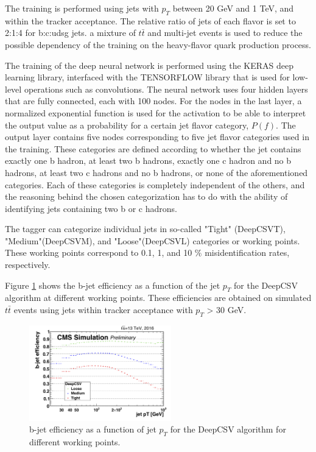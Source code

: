 The training is performed using jets with $p_{T}$ between 20 GeV and 1 TeV, and within the tracker acceptance. The relative ratio of jets of each flavor is set to 2:1:4 for b:c:udsg jets. a mixture of $t\bar{t}$ and multi-jet events is used to reduce the possible dependency of the training on the heavy-flavor quark production process.

The training of the deep neural network is performed using the KERAS\cite{chollet2015keras} deep learning library, interfaced with the TENSORFLOW\cite{tensorflow2015-whitepaper} library that is used for low-level operations such as convolutions. The neural network uses four hidden layers that are fully connected, each with 100 nodes. For the nodes in the last layer, a normalized exponential function is used for the activation to be able to interpret the output value as a probability for a certain jet flavor category, $P(f)$. The output layer contains five nodes corresponding to five jet flavor categories used in the training. These categories are defined according to whether the jet contains exactly one b hadron, at least two b hadrons, exactly one c hadron and no b hadrons, at least two c hadrons and no b hadrons, or none of the aforementioned categories. Each of these categories is completely independent of the others, and the reasoning behind the chosen categorization has to do with the ability of identifying jets containing two b or c hadrons. 

The tagger can categorize individual jets in so-called "Tight" (DeepCSVT), "Medium"(DeepCSVM), and "Loose"(DeepCSVL) categories or working points. These working points correspond to 0.1, 1, and 10 $\%$ misidentification rates, respectively.

Figure \ref{fig:deepcsv} shows the b-jet efficiency as a function of the jet $p_{T}$ for the DeepCSV algorithm at different working points. These efficiencies are obtained on simulated $t\bar{t}$ events using jets within tracker acceptance with $p_{T}$ > 30 GeV.

\begin{figure}[h]
  	\label{fig:deepcsv}
 	\centering
 	\includegraphics[width=0.55\textwidth]{figures/effvspt_b_deep.png}
 	\singlespace
 	\caption{b-jet efficiency as a function of jet $p_{T}$ for the DeepCSV algorithm for different working points. \cite{Sirunyan_2018}}
 \end{figure}

